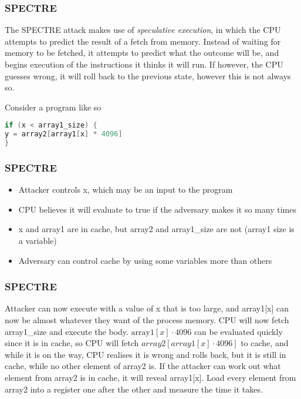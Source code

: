 \begin{frame}[fragile]
    \frametitle{SPECTRE}
    The SPECTRE attack makes use of \textit{speculative execution}, in which the CPU attempts to predict the result of a fetch from memory. Instead of waiting for memory to be fetched, it attempts to predict what the outcome will be, and begins execution of the instructions it thinks it will run. If however, the CPU guesses wrong, it will roll back to the previous state, however this is not always so. 

    Consider a program like so
    \begin{lstlisting}[language=C, frame=single]
if (x < array1_size) {
y = array2[array1[x] * 4096]
}
    \end{lstlisting}
\end{frame}

\begin{frame}
    \frametitle{SPECTRE}
        \begin{itemize}
           \item Attacker controls x, which may be an input to the program 
           \item CPU believes it will evaluate to true if the adversary makes it so many times
           \item x and array1 are in cache, but array2 and array1\_size are not (array1 size is a variable)
           \item Adversary can control cache by using some variables more than others
        \end{itemize}
\end{frame}
\begin{frame}
    \frametitle{SPECTRE}
        Attacker can now execute with a value of x that is too large, and array1[x] can now be almost whatever they want of the process memory. CPU will now fetch array1\_size and execute the body. $\text{array1}[x] \cdot 4096$ can be evaluated quickly since it is in cache, so CPU will fetch $array2[array1[x] \cdot 4096]$ to cache, and while it is on the way, CPU realises it is wrong and rolls back, but it is still in cache, while no other element of array2 is. If the attacker can work out what element from array2 is in cache, it will reveal array1[x]. Load every element from array2 into a register one after the other and measure the time it takes. 
\end{frame}
 
        


